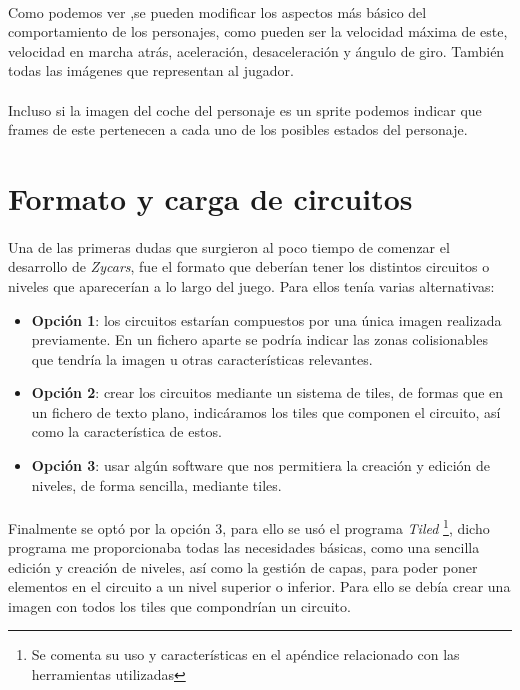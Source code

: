 \paragraph{}
Como podemos ver ,se pueden modificar los aspectos más básico del comportamiento de los personajes, como pueden ser la velocidad 
máxima de este, velocidad en marcha atrás, aceleración, desaceleración y ángulo
de giro. También todas las imágenes que representan
al jugador.

\paragraph{}
Incluso si la imagen del coche del personaje es un sprite podemos indicar que
frames de este pertenecen a cada uno de los posibles 
estados del personaje.

\section{Formato y carga de circuitos}

\paragraph{}
Una de las primeras dudas que surgieron al poco tiempo de comenzar el desarrollo de \emph{Zycars}, fue el formato que deberían
tener los distintos circuitos o niveles que aparecerían a lo largo del juego. Para ellos tenía varias alternativas:

\begin{itemize}
    \item \textbf{Opción 1}: los circuitos estarían compuestos por una única imagen realizada previamente. En un fichero aparte se 
    podría indicar las zonas colisionables que tendría la imagen u otras características relevantes.
    
    \item \textbf{Opción 2}: crear los circuitos mediante un sistema de tiles, de formas que en un fichero de texto plano, 
    indicáramos los tiles que componen el circuito, así como la característica de estos.
    
    \item \textbf{Opción 3}: usar algún software que nos permitiera la creación y edición de niveles, de forma sencilla, 
    mediante tiles.
\end{itemize}

\paragraph{}
Finalmente se optó por la opción 3, para ello se usó el programa \emph{Tiled} \footnote{Se comenta su uso y características en el
apéndice relacionado con las herramientas utilizadas}, dicho programa me proporcionaba todas las necesidades básicas, como una 
sencilla edición y creación de niveles, así como la gestión de capas, para poder poner elementos en el circuito a un nivel 
superior o inferior. Para ello se debía crear una imagen con todos los tiles que compondrían un circuito.

